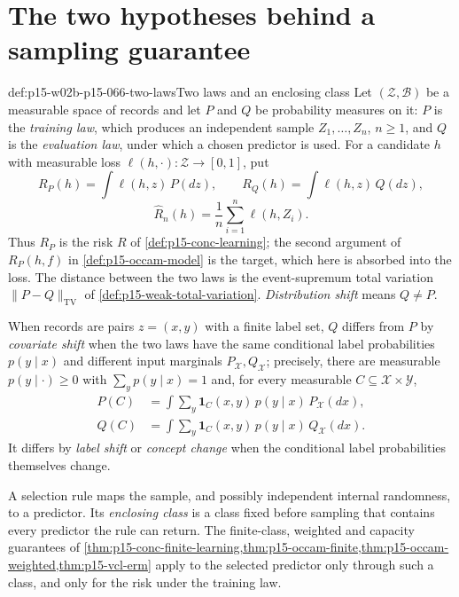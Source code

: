 \section{The two hypotheses behind a sampling guarantee}
\label{sec:p15-w02b-p15-066-hypotheses}

\begin{hbdefinition}{def:p15-w02b-p15-066-two-laws}{Two laws and an enclosing class}
Let \((\mathcal Z,\mathcal B)\) be a measurable space of records and let
\(P\) and \(Q\) be probability measures on it: \(P\) is the
\emph{training law}, which produces an independent sample
\(Z_1,\ldots,Z_n\), \(n\geq1\), and \(Q\) is the \emph{evaluation law},
under which a chosen predictor is used. For a candidate \(h\) with
measurable loss \(\ell(h,\cdot):\mathcal Z\to[0,1]\), put
\[
 R_P(h)=\int\ell(h,z)\,P(dz),\qquad
 R_Q(h)=\int\ell(h,z)\,Q(dz),
\]
\[
 \widehat R_n(h)=\frac1n\sum_{i=1}^n\ell(h,Z_i).
\]
Thus \(R_P\) is the risk \(R\) of \cref{def:p15-conc-learning}; the
second argument of \(R_P(h,f)\) in \cref{def:p15-occam-model} is the
target, which here is absorbed into the loss. The distance between the
two laws is the event-supremum total variation
\(\|P-Q\|_{\mathrm{TV}}\) of \cref{def:p15-weak-total-variation}.
\emph{Distribution shift} means \(Q\neq P\).

When records are pairs \(z=(x,y)\) with a finite label set, \(Q\)
differs from \(P\) by \emph{covariate shift} when the two laws have the
same conditional label probabilities \(p(y\mid x)\) and different input
marginals \(P_{\mathcal X},Q_{\mathcal X}\); precisely, there are
measurable \(p(y\mid\cdot)\geq0\) with \(\sum_yp(y\mid x)=1\) and, for
every measurable \(C\subseteq\mathcal X\times\mathcal Y\),
\[
 \begin{aligned}
 P(C)&=\int\sum_{y}\mathbf1_C(x,y)\,p(y\mid x)\,P_{\mathcal X}(dx),\\
 Q(C)&=\int\sum_{y}\mathbf1_C(x,y)\,p(y\mid x)\,Q_{\mathcal X}(dx).
 \end{aligned}
\]
It differs by \emph{label shift} or \emph{concept change} when the
conditional label probabilities themselves change.

A selection rule maps the sample, and possibly independent internal
randomness, to a predictor. Its \emph{enclosing class} is a class fixed
before sampling that contains every predictor the rule can return.
The finite-class, weighted and capacity guarantees of
\cref{thm:p15-conc-finite-learning,thm:p15-occam-finite,thm:p15-occam-weighted,thm:p15-vcl-erm}
apply to the selected predictor only through such a class, and only
for the risk under the training law.
\end{hbdefinition}

